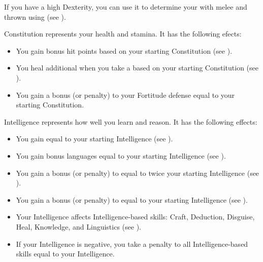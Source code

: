                 If you have a high Dexterity, you can use it to determine your  with melee and thrown  using  (see ).

            \label{Constitution}
                Constitution represents your health and stamina.
                It has the following efects:
                \begin{itemize}
                    \item You gain bonus hit points based on your starting Constitution (see ).
                    \item You heal additional  when you take a  based on your starting Constitution (see ).
                    \item You gain a bonus (or penalty) to your Fortitude defense equal to your starting Constitution.
                \end{itemize}

            \label{Intelligence}
                Intelligence represents how well you learn and reason.
                It has the following effects:

                \begin{itemize}
                    \item You gain  equal to your starting Intelligence (see ).
                    \item You gain bonus languages equal to your starting Intelligence (see ).
                    \item You gain a bonus (or penalty) to  equal to twice your starting Intelligence (see ).
                    \item You gain a bonus (or penalty) to  equal to your starting Intelligence (see ).
                    \item Your Intelligence affects Intelligence-based skills: Craft, Deduction, Disguise, Heal, Knowledge, and Linguistics (see ).
                    \item If your Intelligence is negative, you take a penalty to all Intelligence-based skills equal to your Intelligence.
                \end{itemize}

